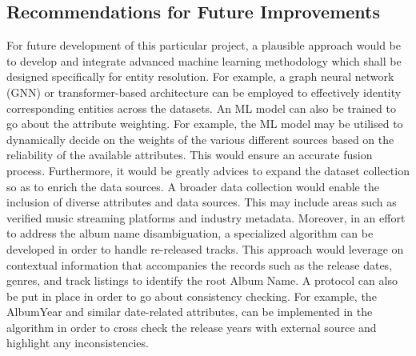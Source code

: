 \documentclass[runningheads]{llncs}
\begin{document}
\subsection{Recommendations for Future Improvements}
For future development of this particular project, a plausible approach would be to develop and integrate advanced machine learning methodology which shall be designed specifically for entity resolution. For example, a graph neural network (GNN) or transformer-based architecture can be employed to effectively identity corresponding entities across the datasets. An ML model can also be trained to go about the attribute weighting. For example, the ML model may be utilised to dynamically decide on the weights of the various different sources based on the reliability of the available attributes. This would ensure an accurate fusion process. Furthermore, it would be greatly advices to expand the dataset collection so as to enrich the data sources. A broader data collection would enable the inclusion of diverse attributes and data sources. This may include areas such as verified music streaming platforms and industry metadata. Moreover, in an effort to address the album name disambiguation, a specialized algorithm can be developed in order to handle re-released tracks. This approach would leverage on contextual information that accompanies the records such as the release dates, genres, and track listings to identify the root Album Name. A protocol can also be put in place in order to go about consistency checking. For example, the AlbumYear and similar date-related attributes, can be implemented in the algorithm in order to cross check the release years with external source and highlight any inconsistencies. 


 
\end{document}

